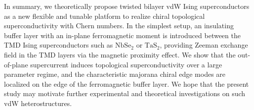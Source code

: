 \vspace{1em}
In summary, we theoretically propose twisted bilayer vdW Ising superconductors as a new flexible and tunable platform to realize chiral topological superconductivity with Chern numbers. In the simplest setup, an insulating buffer layer with an in-plane ferromagnetic moment is introduced between the TMD Ising superconductors such as $\mathrm{NbSe_2}$ or $\mathrm{TaS_2}$, providing Zeeman exchange field in the TMD layers via the magnetic proximity effect. We show that the out-of-plane supercurrent induces topological superconductivity over a large parameter regime, and the characteristic majorana chiral edge modes are localized on the edge of the ferromagnetic buffer layer. We hope that the present study may motivate further experimental and theoretical investigations on such vdW heterostructures.


